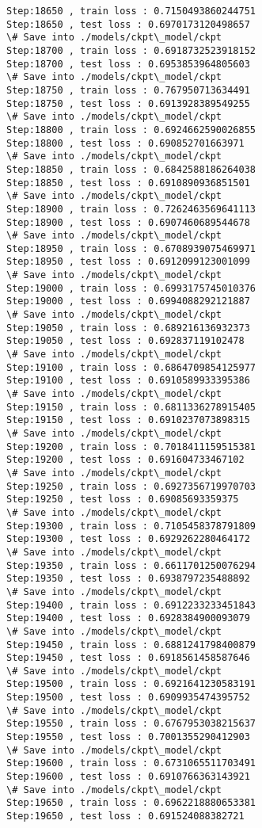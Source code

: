 \documentclass[11pt]{article}
\begin{document}
\begin{Verbatim}[commandchars=\\\{\}]
Step:18650 , train loss : 0.7150493860244751
Step:18650 , test loss : 0.6970173120498657
\# Save into ./models/ckpt\_model/ckpt
Step:18700 , train loss : 0.6918732523918152
Step:18700 , test loss : 0.6953853964805603
\# Save into ./models/ckpt\_model/ckpt
Step:18750 , train loss : 0.767950713634491
Step:18750 , test loss : 0.6913928389549255
\# Save into ./models/ckpt\_model/ckpt
Step:18800 , train loss : 0.6924662590026855
Step:18800 , test loss : 0.690852701663971
\# Save into ./models/ckpt\_model/ckpt
Step:18850 , train loss : 0.6842588186264038
Step:18850 , test loss : 0.6910890936851501
\# Save into ./models/ckpt\_model/ckpt
Step:18900 , train loss : 0.7262463569641113
Step:18900 , test loss : 0.6907460689544678
\# Save into ./models/ckpt\_model/ckpt
Step:18950 , train loss : 0.6708939075469971
Step:18950 , test loss : 0.6912099123001099
\# Save into ./models/ckpt\_model/ckpt
Step:19000 , train loss : 0.6993175745010376
Step:19000 , test loss : 0.6994088292121887
\# Save into ./models/ckpt\_model/ckpt
Step:19050 , train loss : 0.689216136932373
Step:19050 , test loss : 0.692837119102478
\# Save into ./models/ckpt\_model/ckpt
Step:19100 , train loss : 0.6864709854125977
Step:19100 , test loss : 0.6910589933395386
\# Save into ./models/ckpt\_model/ckpt
Step:19150 , train loss : 0.6811336278915405
Step:19150 , test loss : 0.6910237073898315
\# Save into ./models/ckpt\_model/ckpt
Step:19200 , train loss : 0.7018411159515381
Step:19200 , test loss : 0.691604733467102
\# Save into ./models/ckpt\_model/ckpt
Step:19250 , train loss : 0.6927356719970703
Step:19250 , test loss : 0.69085693359375
\# Save into ./models/ckpt\_model/ckpt
Step:19300 , train loss : 0.7105458378791809
Step:19300 , test loss : 0.6929262280464172
\# Save into ./models/ckpt\_model/ckpt
Step:19350 , train loss : 0.6611701250076294
Step:19350 , test loss : 0.6938797235488892
\# Save into ./models/ckpt\_model/ckpt
Step:19400 , train loss : 0.6912233233451843
Step:19400 , test loss : 0.6928384900093079
\# Save into ./models/ckpt\_model/ckpt
Step:19450 , train loss : 0.6881241798400879
Step:19450 , test loss : 0.6918561458587646
\# Save into ./models/ckpt\_model/ckpt
Step:19500 , train loss : 0.6921641230583191
Step:19500 , test loss : 0.6909935474395752
\# Save into ./models/ckpt\_model/ckpt
Step:19550 , train loss : 0.6767953038215637
Step:19550 , test loss : 0.7001355290412903
\# Save into ./models/ckpt\_model/ckpt
Step:19600 , train loss : 0.6731065511703491
Step:19600 , test loss : 0.6910766363143921
\# Save into ./models/ckpt\_model/ckpt
Step:19650 , train loss : 0.6962218880653381
Step:19650 , test loss : 0.691524088382721

\end{Verbatim}
\end{document}
